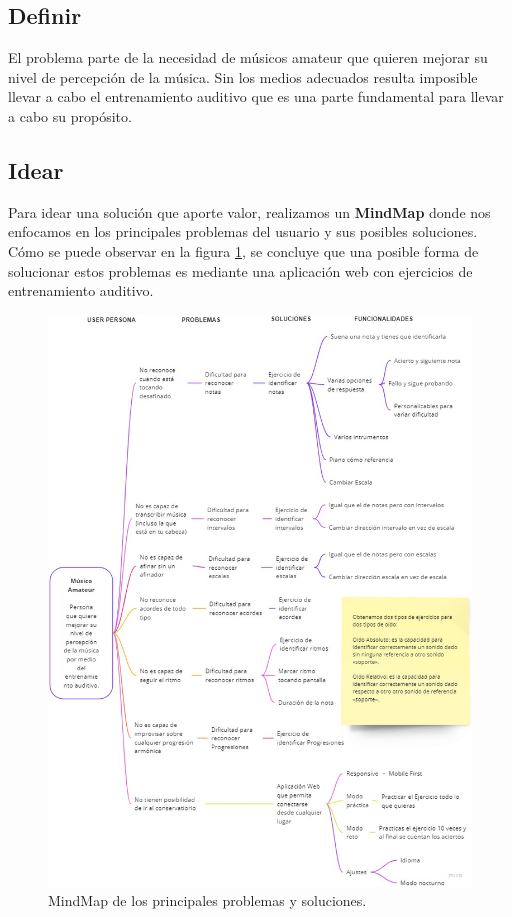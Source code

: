 \documentclass[12pt,twoside,titlepage]{report}
\begin{document}
\subsection{Definir}

El problema parte de la necesidad de músicos amateur que quieren mejorar su nivel de percepción de la música. Sin los medios adecuados resulta imposible llevar a cabo el entrenamiento auditivo que es una parte fundamental para llevar a cabo su propósito. 

\subsection{Idear}

Para idear una solución que aporte valor, realizamos un \textbf{MindMap} donde nos enfocamos en los principales problemas del usuario y sus posibles soluciones.
Cómo se puede observar en la figura \ref{fig:Mindmap}, se concluye que una posible forma de solucionar estos problemas es mediante una aplicación web con ejercicios de entrenamiento auditivo. 

\begin{figure}[H]
    \centering
    \includegraphics[scale=0.47]{Design Thinking/MindMap}
    \caption{MindMap de los principales problemas y soluciones.} 
    \label{fig:Mindmap}
\end{figure}
\end{document}
